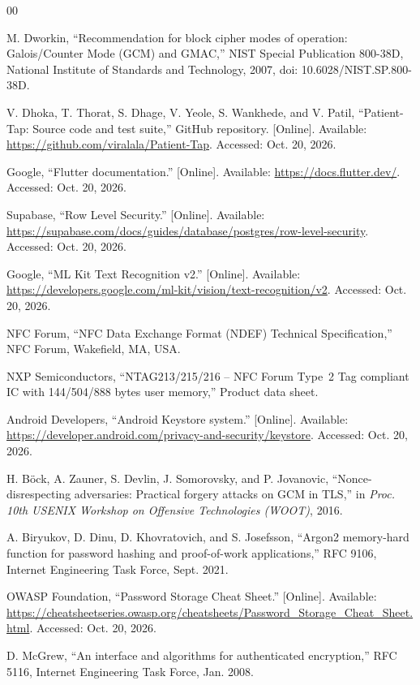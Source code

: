 \begin{thebibliography}{00}

 M. Dworkin, ``Recommendation for block cipher modes of
operation: Galois/Counter Mode (GCM) and GMAC,'' NIST Special Publication
800-38D, National Institute of Standards and Technology, 2007,
doi: 10.6028/NIST.SP.800-38D.

 V. Dhoka, T. Thorat, S. Dhage, V. Yeole, S. Wankhede, and
V. Patil, ``Patient-Tap: Source code and test suite,'' GitHub repository.
[Online]. Available: \url{https://github.com/viralala/Patient-Tap}.
Accessed: Oct. 20, 2026.

 Google, ``Flutter documentation.'' [Online]. Available:
\url{https://docs.flutter.dev/}. Accessed: Oct. 20, 2026.

 Supabase, ``Row Level Security.'' [Online]. Available:
\url{https://supabase.com/docs/guides/database/postgres/row-level-security}.
Accessed: Oct. 20, 2026.

 Google, ``ML Kit Text Recognition v2.'' [Online]. Available:
\url{https://developers.google.com/ml-kit/vision/text-recognition/v2}.
Accessed: Oct. 20, 2026.

 NFC Forum, ``NFC Data Exchange Format (NDEF) Technical
Specification,'' NFC Forum, Wakefield, MA, USA.

 NXP Semiconductors, ``NTAG213/215/216 -- NFC Forum Type~2 Tag
compliant IC with 144/504/888 bytes user memory,'' Product data sheet.

 Android Developers, ``Android Keystore system.'' [Online].
Available: \url{https://developer.android.com/privacy-and-security/keystore}.
Accessed: Oct. 20, 2026.

 H. B\"{o}ck, A. Zauner, S. Devlin, J. Somorovsky, and
P. Jovanovic, ``Nonce-disrespecting adversaries: Practical forgery attacks on
GCM in TLS,'' in \emph{Proc. 10th USENIX Workshop on Offensive Technologies
(WOOT)}, 2016.

 A. Biryukov, D. Dinu, D. Khovratovich, and S. Josefsson,
``Argon2 memory-hard function for password hashing and proof-of-work
applications,'' RFC 9106, Internet Engineering Task Force, Sept. 2021.

 OWASP Foundation, ``Password Storage Cheat Sheet.'' [Online].
Available:
\url{https://cheatsheetseries.owasp.org/cheatsheets/Password_Storage_Cheat_Sheet.html}.
Accessed: Oct. 20, 2026.

 D. McGrew, ``An interface and algorithms for authenticated
encryption,'' RFC 5116, Internet Engineering Task Force, Jan. 2008.


\end{thebibliography}
